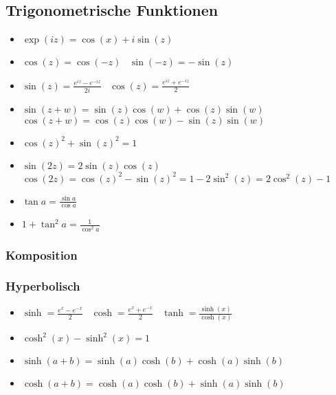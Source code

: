 \subsection{Trigonometrische Funktionen}
\begin{itemize}
     $\frac{a}{\sin \alpha} = \frac{b}{\sin \beta} = \frac{c}{\sin \gamma} = 2r$
     $a^2 = b^2 + c^2 - 2ab \cos \alpha$
     $\tan(z) := \frac{\sin(z)}{\cos(z)}, z \not\in \{\frac{\pi}{2} + \pi k\}$
     $\cot(z) := \frac{\cos(z)}{\sin(z)}, z \not\in \{\pi k\}$
    \item $\exp(iz) = \cos(x) + i \sin(z)$
    \item $\cos(z) = \cos(-z)$ \textbullet\ $\sin(-z) = - \sin(z)$
    \item $\sin(z) = \frac{e^{iz} - e^{-iz}}{2i}$ \textbullet\ $\cos(z) = \frac{e^{iz} + e^{-iz}}{2}$
    \item $\sin(z + w) = \sin(z) \cos(w) + \cos(z) \sin(w)$ \textbullet\ $\cos(z + w) = \cos(z) \cos(w) - \sin(z) \sin(w)$
    \item $\cos(z)^2 + \sin(z)^2 = 1$
    \item $\sin(2z) = 2 \sin(z) \cos(z)$ \textbullet\ $\cos(2z) = \cos(z)^2 - \sin(z)^2 = 1 - 2 \sin^2(z) = 2 \cos^2(z) - 1$
    \item $\tan a = \frac{\sin a}{\cos a}$
    \item $1 + \tan^2 a = \frac{1}{\cos^2 a}$
\end{itemize}

\subsubsection{Komposition}

\subsubsection{Hyperbolisch}
\begin{itemize}
    \item $\sinh = \frac{e^x - e^{-x}}{2}$ \textbullet\ $\cosh = \frac{e^x+e^{-x}}{2}$ \textbullet\ $\tanh = \frac{\sinh(x)}{\cosh(x)}$

    \item $\cosh^2(x) - \sinh^2(x) = 1$
    \item $\sinh(a + b) = \sinh(a)\cosh(b) + \cosh(a)\sinh(b)$
    \item $\cosh(a + b) = \cosh(a)\cosh(b) + \sinh(a)\sinh(b)$
\end{itemize}

